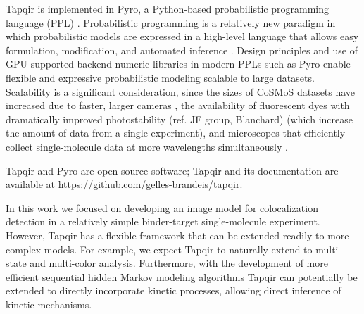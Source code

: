 Tapqir is implemented in Pyro, a Python-based probabilistic programming language (PPL) \cite{Bingham2019-qy}. Probabilistic programming is a relatively new paradigm in which probabilistic models are expressed in a high-level language that allows easy formulation, modification, and automated inference \cite{Van_de_Meent2018-mi}. Design principles and use of GPU-supported backend numeric libraries in modern PPLs such as Pyro enable flexible and expressive probabilistic modeling scalable to large datasets. Scalability is a significant consideration, since the sizes of CoSMoS datasets have increased due to faster, larger cameras \cite{Quan2011-cg}, the availability of fluorescent dyes with dramatically improved photostability \cite{Grimm2015-ea} (ref. JF group, Blanchard) (which increase the amount of data from a single experiment), and microscopes that efficiently collect single-molecule data at more wavelengths simultaneously \cite{Friedman2006-kb}. 

Tapqir and Pyro are open-source software; Tapqir and its documentation are available at \url{https://github.com/gelles-brandeis/tapqir}.


In this work we focused on developing an image model for colocalization detection in a relatively simple binder-target single-molecule experiment. However, Tapqir has a flexible framework that can be extended readily to more complex models. For example, we expect Tapqir to naturally extend to multi-state and multi-color analysis. Furthermore, with the development of more efficient sequential hidden Markov modeling algorithms \cite{Sarkka2019-jw,Obermeyer2019-pp} Tapqir can potentially be extended to directly incorporate kinetic processes, allowing direct inference of kinetic mechanisms.

